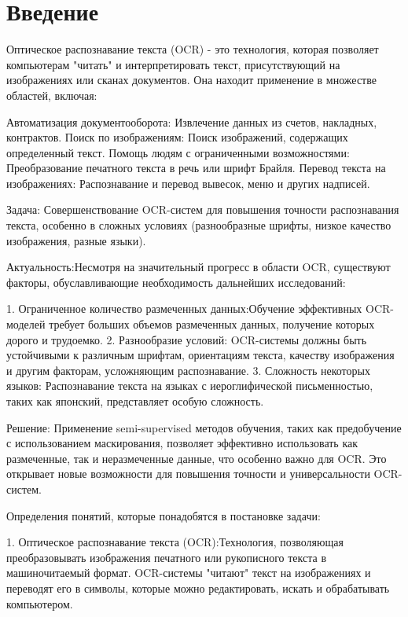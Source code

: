 \section{Введение}
\label{sec:Chapter0} 

Оптическое распознавание текста (OCR) - это технология, которая позволяет компьютерам "читать" и интерпретировать текст, присутствующий на изображениях или сканах документов. Она находит применение в множестве областей, включая:

Автоматизация документооборота: Извлечение данных из счетов, накладных, контрактов.
Поиск по изображениям: Поиск изображений, содержащих определенный текст.
Помощь людям с ограниченными возможностями: Преобразование печатного текста в речь или шрифт Брайля.
Перевод текста на изображениях: Распознавание и перевод вывесок, меню и других надписей.

Задача: Совершенствование  OCR-систем для повышения точности распознавания текста, особенно  в сложных условиях (разнообразные шрифты, низкое качество изображения,  разные языки).

Актуальность:Несмотря на  значительный прогресс в области OCR,  существуют  факторы,  обуславливающие необходимость дальнейших исследований:

1. Ограниченное количество размеченных данных:Обучение  эффективных  OCR-моделей требует  больших объемов размеченных данных,  получение которых  дорого  и трудоемко.
2. Разнообразие  условий: OCR-системы должны быть устойчивыми к различным шрифтам,  ориентациям текста, качеству изображения и другим факторам,  усложняющим распознавание.
3. Сложность  некоторых языков: Распознавание  текста на  языках  с  иероглифической  письменностью,  таких как  японский,  представляет  особую  сложность.

Решение: Применение  semi-supervised  методов обучения,  таких как  предобучение с использованием  маскирования,  позволяет эффективно использовать  как размеченные,  так и неразмеченные данные,  что  особенно  важно для  OCR.  Это  открывает  новые  возможности для  повышения  точности  и  универсальности  OCR-систем. 

Определения понятий, которые понадобятся в постановке задачи:

1. Оптическое распознавание текста (OCR):Технология, позволяющая преобразовывать изображения печатного или рукописного текста в машиночитаемый формат. OCR-системы "читают" текст на изображениях и переводят его в символы, которые можно редактировать, искать и обрабатывать компьютером.

